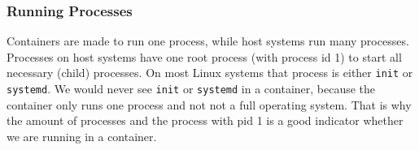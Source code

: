 \subsubsection{Running Processes}
Containers are made to run one process, while host systems run many processes. Processes on host systems have one root process (with process id 1) to start all necessary (child) processes. On most Linux systems that process is either \lstinline{init} or \lstinline{systemd}. We would never see \lstinline{init} or \lstinline{systemd} in a container, because the container only runs one process and not not a full operating system. That is why the amount of processes and the process with pid 1 is a good indicator whether we are running in a container.
